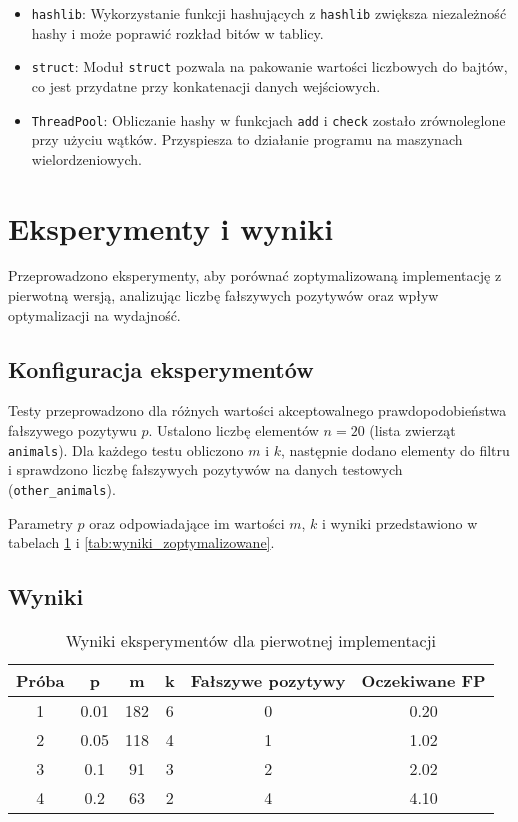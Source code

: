 \documentclass{article}
\begin{document}
\begin{itemize}
    \item \texttt{hashlib}: Wykorzystanie funkcji hashujących z \texttt{hashlib} zwiększa niezależność hashy i może poprawić rozkład bitów w tablicy.
    \item \texttt{struct}: Moduł \texttt{struct} pozwala na pakowanie wartości liczbowych do bajtów, co jest przydatne przy konkatenacji danych wejściowych.
    \item \texttt{ThreadPool}: Obliczanie hashy w funkcjach \texttt{add} i \texttt{check} zostało zrównoleglone przy użyciu wątków. Przyspiesza to działanie programu na maszynach wielordzeniowych.
\end{itemize}

\section{Eksperymenty i wyniki}

Przeprowadzono eksperymenty, aby porównać zoptymalizowaną implementację z pierwotną wersją, analizując liczbę fałszywych pozytywów oraz wpływ optymalizacji na wydajność.

\subsection{Konfiguracja eksperymentów}

Testy przeprowadzono dla różnych wartości akceptowalnego prawdopodobieństwa fałszywego pozytywu $p$. Ustalono liczbę elementów $n = 20$ (lista zwierząt \texttt{animals}). Dla każdego testu obliczono $m$ i $k$, następnie dodano elementy do filtru i sprawdzono liczbę fałszywych pozytywów na danych testowych (\texttt{other\_animals}).

Parametry $p$ oraz odpowiadające im wartości $m$, $k$ i wyniki przedstawiono w tabelach \ref{tab:wyniki_pierwotne} i \ref{tab:wyniki_zoptymalizowane}.

\subsection{Wyniki}

\begin{table}[H]
\centering
\begin{tabular}{cccccc}
\toprule
\textbf{Próba} & \textbf{p} & \textbf{m} & \textbf{k} & \textbf{Fałszywe pozytywy} & \textbf{Oczekiwane FP} \\
\midrule
1 & 0.01 & 182 & 6 & 0 & 0.20 \\
2 & 0.05 & 118 & 4 & 1 & 1.02 \\
3 & 0.1 & 91 & 3 & 2 & 2.02 \\
4 & 0.2 & 63 & 2 & 4 & 4.10 \\
\bottomrule
\end{tabular}
\caption{Wyniki eksperymentów dla pierwotnej implementacji}
\label{tab:wyniki_pierwotne}
\end{table}
\end{document}
